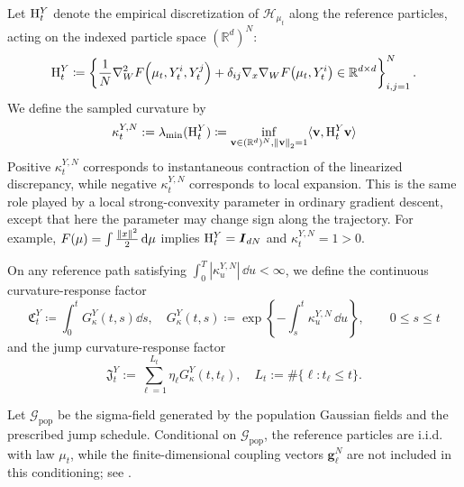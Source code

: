 \begin{definition}
\label{def:curvature-responses}
Let  $\mathrm{H}_t^Y$ denote the empirical discretization of $\mathcal{H}_{\mu_t}$ along the
reference particles, acting on the indexed particle space $(\mathbb R^d)^N$:
\begin{equation}
    \mathrm{H}_t^Y\coloneq
    \left\{
    \frac{1}{N}
    \nabla_W^2 F\!\left(\mu_t,Y^i_t,Y^j_t\right)
    + \delta_{ij}\nabla_x\nabla_W F\!\left(\mu_t,Y^i_t\right)\in \mathbb{R}^{d\times d}\right\}_{i,j=1}^N.
\end{equation}
We define the sampled curvature by
\begin{equation}
    \kappa^{Y,N}_t := \lambda_{\min}(\mathrm{H}^Y_t) \coloneq 
    \inf_{\mathbf v \in (\mathbb{R}^d)^N, \norm{\mathbf v}_2=1}
    \langle \mathbf v,\mathrm{H}^Y_t \mathbf v\rangle
    \label{eq:curvature-main}
\end{equation}
Positive \(\kappa_t^{Y,N}\) corresponds to instantaneous contraction of the
linearized discrepancy, while negative \(\kappa_t^{Y,N}\) corresponds to local
expansion.  This is the same role played by a local strong-convexity parameter in
ordinary gradient descent, except that here the parameter may change sign along
the trajectory. For example, $F(\mu)=\int \frac{\norm{x}^2}{2}\,\dd\mu$ implies $\mathrm{H}_t^Y = \boldsymbol{I}_{dN}$ and $\kappa_t^{Y,N} = 1>0$.

On any reference path satisfying
\(\int_0^T|\kappa_u^{Y,N}|\,\dd u<\infty\), we define the continuous
curvature-response factor
\[
    \mathfrak C_t^Y
    \coloneq 
    \int_0^t
    G_\kappa^Y(t,s)
    \dd s ,\quad G_\kappa^Y(t,s)
    \coloneq 
    \exp\left\{-\int_s^t \kappa_u^{Y,N}\,\dd u\right\},
    \qquad 0\le s\le t
\]
and the jump curvature-response factor
\[
    \mathfrak J_t^Y
    :=
    \sum_{\ell=1}^{L_t}
    \eta_\ell
    G_\kappa^Y(t,t_\ell)
    ,\quad L_t:=\#\{\ell:t_\ell\le t\}.
\]
\end{definition}
\begin{remark}
Let \(\mathcal G_{\mathrm{pop}}\) be the sigma-field generated by the population
Gaussian fields and the prescribed jump schedule. Conditional on
\(\mathcal G_{\mathrm{pop}}\), the reference particles are i.i.d. with law
\(\mu_t\), while the finite-dimensional coupling vectors
\(\mathbf g_\ell^N\) are not included in this conditioning; see
.
\end{remark}

